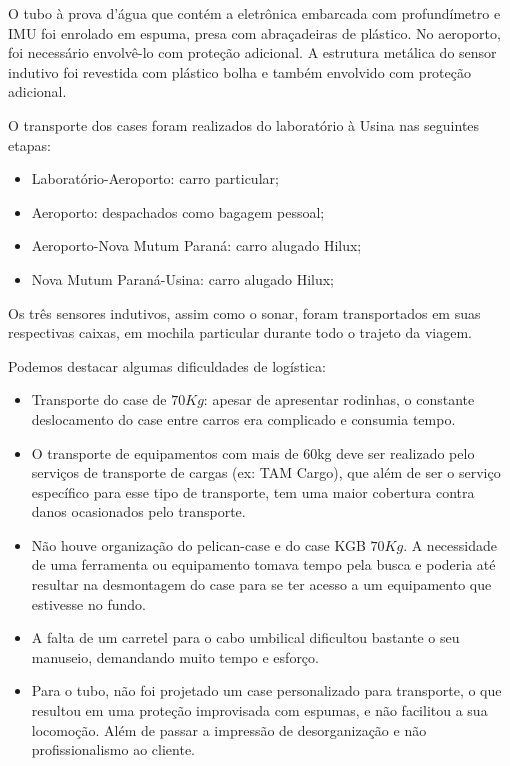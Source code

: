 O tubo à prova d'água que contém a eletrônica embarcada com profundímetro e
IMU foi enrolado em espuma, presa com abraçadeiras de plástico. No aeroporto,
foi necessário envolvê-lo com proteção adicional. A estrutura metálica do sensor
indutivo foi revestida com plástico bolha e também envolvido com proteção
adicional.

O transporte dos cases foram realizados do laboratório à Usina nas
seguintes etapas:
\begin{itemize}
  \item Laboratório-Aeroporto: carro particular;
  \item Aeroporto: despachados como bagagem pessoal;
  \item Aeroporto-Nova Mutum Paraná: carro alugado Hilux;
  \item Nova Mutum Paraná-Usina: carro alugado Hilux;
\end{itemize} 

Os três sensores indutivos, assim como o sonar, foram transportados em suas
respectivas caixas, em mochila particular durante todo o trajeto da viagem.


Podemos destacar algumas dificuldades de logística:
\begin{itemize}
  \item Transporte do case de $70 Kg$: apesar de apresentar rodinhas, o
  constante deslocamento do case entre carros era complicado e consumia tempo.
  \item O transporte de equipamentos com mais de 60kg deve ser realizado pelo
  serviços de transporte de cargas (ex: TAM Cargo), que além de ser o serviço
  específico para esse tipo de transporte, tem uma maior cobertura contra danos ocasionados pelo
  transporte.
  \item Não houve organização do pelican-case e do case KGB $70 Kg$. A
  necessidade de uma ferramenta ou equipamento tomava tempo pela busca e poderia
  até resultar na desmontagem do case para se ter acesso a um equipamento que
  estivesse no fundo.
  \item A falta de um carretel para o cabo umbilical dificultou bastante o seu
  manuseio, demandando muito tempo e esforço.
  \item Para o tubo, não foi projetado um case personalizado para transporte, o
  que resultou em uma proteção improvisada com espumas, e não facilitou a sua
  locomoção. Além de passar a impressão de desorganização e não profissionalismo
  ao cliente.

\end{itemize} 

